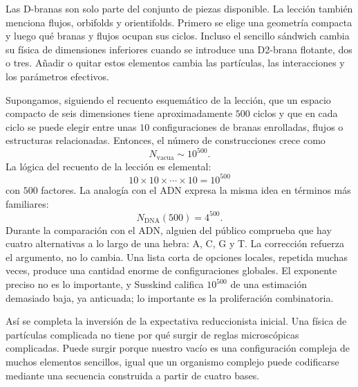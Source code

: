 Las D-branas son solo parte del conjunto de piezas disponible. La lección también menciona flujos, orbifolds y orientifolds. Primero se elige una geometría compacta y luego qué branas y flujos ocupan sus ciclos. Incluso el sencillo sándwich cambia su física de dimensiones inferiores cuando se introduce una D2-brana flotante, dos o tres. Añadir o quitar estos elementos cambia las partículas, las interacciones y los parámetros efectivos.

Supongamos, siguiendo el recuento esquemático de la lección, que un espacio compacto de seis dimensiones tiene aproximadamente \(500\) ciclos y que en cada ciclo se puede elegir entre unas \(10\) configuraciones de branas enrolladas, flujos o estructuras relacionadas. Entonces, el número de construcciones crece como
\begin{equation}
N_{\mathrm{vacua}} \sim 10^{500}.
\end{equation}
La lógica del recuento de la lección es elemental:
\begin{equation}
10 \times 10 \times \cdots \times 10 = 10^{500}
\end{equation}
con \(500\) factores. La analogía con el ADN expresa la misma idea en términos más familiares:
\begin{equation}
N_{\mathrm{DNA}}(500)=4^{500}.
\end{equation}
Durante la comparación con el ADN, alguien del público comprueba que hay cuatro alternativas a lo largo de una hebra: A, C, G y T. La corrección refuerza el argumento, no lo cambia. Una lista corta de opciones locales, repetida muchas veces, produce una cantidad enorme de configuraciones globales. El exponente preciso no es lo importante, y Susskind califica \(10^{500}\) de una estimación demasiado baja, ya anticuada; lo importante es la proliferación combinatoria.

Así se completa la inversión de la expectativa reduccionista inicial. Una física de partículas complicada no tiene por qué surgir de reglas microscópicas complicadas. Puede surgir porque nuestro vacío es una configuración compleja de muchos elementos sencillos, igual que un organismo complejo puede codificarse mediante una secuencia construida a partir de cuatro bases.

\begin{classroomqa}
\end{classroomqa}

